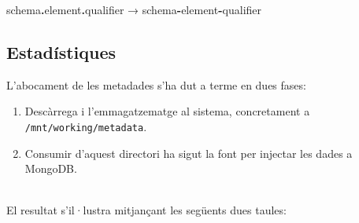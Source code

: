 \begin{center}
  schema\textbf{.}element\textbf{.}qualifier → schema\textbf{-}element\textbf{-}qualifier
\end{center}

\clearpage

\subsection{Estadístiques}\label{subsec:metadata-statistics}

L'abocament de les metadades s'ha dut a terme en dues fases:

\begin{enumerate}
  \item Descàrrega i l'emmagatzematge al sistema, concretament a \\ \texttt{/mnt/working/metadata}.
  \item Consumir d'aquest directori ha sigut la font per injectar les dades a \\ MongoDB.
\end{enumerate}

\noindent \\
El resultat s'il·lustra mitjançant les següents dues taules: \\

